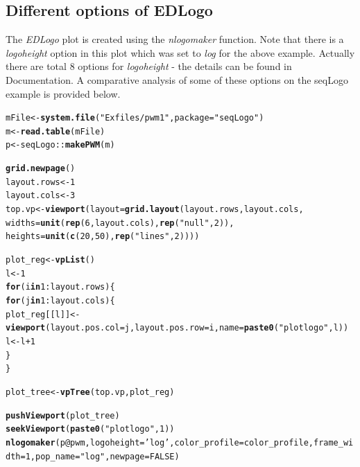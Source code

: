 \documentclass[12pt]{article}\usepackage[]{graphicx}\usepackage[usenames,dvipsnames]{color}
\makeatletter
\newcommand{\hlnum}[1]{\textcolor[rgb]{0.686,0.059,0.569}{#1}}%
\newcommand{\hlstr}[1]{\textcolor[rgb]{0.192,0.494,0.8}{#1}}%
\newcommand{\hlopt}[1]{\textcolor[rgb]{0,0,0}{#1}}%
\newcommand{\hlstd}[1]{\textcolor[rgb]{0.345,0.345,0.345}{#1}}%
\newcommand{\hlkwa}[1]{\textcolor[rgb]{0.161,0.373,0.58}{\textbf{#1}}}%
\newcommand{\hlkwb}[1]{\textcolor[rgb]{0.69,0.353,0.396}{#1}}%
\newcommand{\hlkwc}[1]{\textcolor[rgb]{0.333,0.667,0.333}{#1}}%
\newcommand{\hlkwd}[1]{\textcolor[rgb]{0.737,0.353,0.396}{\textbf{#1}}}%
\newenvironment{kframe}{%
 \def\at@end@of@kframe{}%
 \ifinner\ifhmode%
  \def\at@end@of@kframe{\end{minipage}}%
  \begin{minipage}{\columnwidth}%
 \fi\fi%
 \def\FrameCommand##1{\hskip\@totalleftmargin \hskip-\fboxsep
 \colorbox{shadecolor}{##1}\hskip-\fboxsep
     \hskip-\linewidth \hskip-\@totalleftmargin \hskip\columnwidth}%
 \MakeFramed {\advance\hsize-\width
   \@totalleftmargin\z@ \linewidth\hsize
   \@setminipage}}%
 {\par\unskip\endMakeFramed%
 \at@end@of@kframe}
\newenvironment{knitrout}{}{} %
\makeatother
\begin{document}
\subsection{Different options of EDLogo}

The \textit{EDLogo} plot is created using the \textit{nlogomaker} function. Note that there is a \textit{logoheight} option in this plot which was set to \textit{log} for the above example. Actually there are total $8$ options for \textit{logoheight} - the details can be found in Documentation. A comparative analysis of some of these options on the seqLogo example is provided below.

\begin{knitrout}
\color{fgcolor}\begin{kframe}
\begin{alltt}
\hlstd{mFile} \hlkwb{<-} \hlkwd{system.file}\hlstd{(}\hlstr{"Exfiles/pwm1"}\hlstd{,} \hlkwc{package}\hlstd{=}\hlstr{"seqLogo"}\hlstd{)}
\hlstd{m} \hlkwb{<-} \hlkwd{read.table}\hlstd{(mFile)}
\hlstd{p} \hlkwb{<-} \hlstd{seqLogo}\hlopt{::}\hlkwd{makePWM}\hlstd{(m)}

\hlkwd{grid.newpage}\hlstd{()}
\hlstd{layout.rows} \hlkwb{<-} \hlnum{1}
\hlstd{layout.cols} \hlkwb{<-} \hlnum{3}
\hlstd{top.vp} \hlkwb{<-} \hlkwd{viewport}\hlstd{(}\hlkwc{layout}\hlstd{=}\hlkwd{grid.layout}\hlstd{(layout.rows, layout.cols,}
                                      \hlkwc{widths}\hlstd{=}\hlkwd{unit}\hlstd{(}\hlkwd{rep}\hlstd{(}\hlnum{6}\hlstd{,layout.cols),} \hlkwd{rep}\hlstd{(}\hlstr{"null"}\hlstd{,} \hlnum{2}\hlstd{)),}
                                      \hlkwc{heights}\hlstd{=}\hlkwd{unit}\hlstd{(}\hlkwd{c}\hlstd{(}\hlnum{20}\hlstd{,}\hlnum{50}\hlstd{),} \hlkwd{rep}\hlstd{(}\hlstr{"lines"}\hlstd{,} \hlnum{2}\hlstd{))))}

\hlstd{plot_reg} \hlkwb{<-} \hlkwd{vpList}\hlstd{()}
\hlstd{l} \hlkwb{<-} \hlnum{1}
\hlkwa{for}\hlstd{(i} \hlkwa{in} \hlnum{1}\hlopt{:}\hlstd{layout.rows)\{}
  \hlkwa{for}\hlstd{(j} \hlkwa{in} \hlnum{1}\hlopt{:}\hlstd{layout.cols)\{}
    \hlstd{plot_reg[[l]]} \hlkwb{<-} \hlkwd{viewport}\hlstd{(}\hlkwc{layout.pos.col} \hlstd{= j,} \hlkwc{layout.pos.row} \hlstd{= i,} \hlkwc{name} \hlstd{=} \hlkwd{paste0}\hlstd{(}\hlstr{"plotlogo"}\hlstd{, l))}
    \hlstd{l} \hlkwb{<-} \hlstd{l}\hlopt{+}\hlnum{1}
  \hlstd{\}}
\hlstd{\}}


\hlstd{plot_tree} \hlkwb{<-} \hlkwd{vpTree}\hlstd{(top.vp, plot_reg)}

\hlkwd{pushViewport}\hlstd{(plot_tree)}
\hlkwd{seekViewport}\hlstd{(}\hlkwd{paste0}\hlstd{(}\hlstr{"plotlogo"}\hlstd{,} \hlnum{1}\hlstd{))}
\hlkwd{nlogomaker}\hlstd{(p}\hlopt{@}\hlkwc{pwm}\hlstd{,}\hlkwc{logoheight} \hlstd{=} \hlstr{'log'}\hlstd{,}\hlkwc{color_profile} \hlstd{= color_profile,}\hlkwc{frame_width} \hlstd{=} \hlnum{1}\hlstd{,} \hlkwc{pop_name} \hlstd{=} \hlstr{"log"}\hlstd{,} \hlkwc{newpage} \hlstd{=} \hlnum{FALSE}\hlstd{)}



\end{alltt}
\end{kframe}
\end{knitrout}
\end{document}
